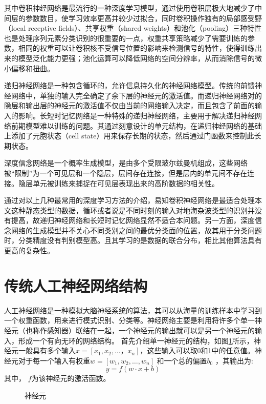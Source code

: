 其中卷积神经网络是最流行的一种深度学习模型，通过使用卷积层极大地减少了中间层的参数数目，使学习效率更高并较少过拟合，同时卷积操作独有的局部感受野（local receptive fields）、共享权重（shared weights）和池化（pooling）三种特性也是处理序列元素分类识别的很重要的一点，权重共享策略减少了需要训练的参数，相同的权重可以让卷积核不受信号位置的影响来检测信号的特性，使得训练出来的模型泛化能力更强；池化运算可以降低网络的空间分辨率，从而消除信号的微小偏移和扭曲。

递归神经网络是一种包含循环的，允许信息持久化的神经网络模型。传统的前馈神经网络中，单独的输入完全确定了余下层的神经元的激活值。而递归神经网络对的隐层和输出层的神经元的激活值不仅由当前的网络输入决定，而且包含了前面的输入的影响。长短时记忆网络是一种特殊的递归神经网络，主要用于解决递归神经网络前期模型难以训练的问题。其通过刻意设计的单元结构，在递归神经网络的基础上添加了元胞状态（cell state）用来保存长期的状态，然后通过门函数来控制此长期状态。

深度信念网络是一个概率生成模型，是由多个受限玻尔兹曼机组成，这些网络被“限制”为一个可见层和一个隐层，层间存在连接，但是层内的单元间不存在连接。隐层单元被训练来捕捉在可见层表现出来的高阶数据的相关性。

通过对以上几种最常用的深度学习方法的介绍，易知卷积神经网络是最适合处理本文这种静态类型的数据，循环或者说是不同时刻的输入对地海杂波类型的识别并没有提高，故递归神经网络和长短时记忆网络显然不适合本问题。另一方面，深度信念网络的生成模型并不关心不同类别之间的最优分类面的位置，故其用于分类问题时，分类精度没有判别模型高。且其学习的是数据的联合分布，相比其他算法具有更高的复杂性。

\section{传统人工神经网络结构}
\label{sec:neural}
人工神经网络是一种模拟大脑神经系统的算法，其可以从海量的训练样本中学习到一个权重函数，用来进行模式识别、分类等。神经网络主要是利用将许多个单一神经元（也称作感知器）联结在一起，一个神经元的输出就可以是另一个神经元的输入，形成一个有向无环的网络结构。
首先介绍单一神经元的结构，如图\ref{fig:neural}所示，神经元一般具有多个输入$x=[x_1,x_2,\dots，x_n] $，这些输入可以取0和1中的任意值。神经元对于每一个输入有权重$w=[w_1,w_2,\dots,w_n] $ 和一个总的偏置$b_0$ ，其输出为:
\begin{equation}
  y = f(w\cdot x + b)
  \label{equ:neural}
\end{equation}
其中， $f$为该神经元的激活函数。

\begin{figure}
  \centering   \sWuhao
  
  \caption{神经元}
  \label{fig:neural}
\end{figure}


